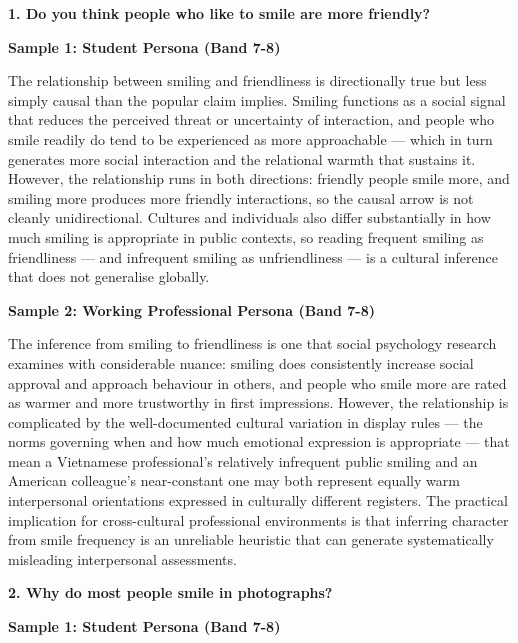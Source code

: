 \partthreeheader

\begin{ieltsquestion}
\textbf{1. Do you think people who like to smile are more friendly?}
\end{ieltsquestion}
\textbf{Sample 1: Student Persona (Band 7-8)}

The relationship between smiling and friendliness is directionally true but less simply causal than the popular claim implies. Smiling functions as a social signal that reduces the perceived threat or uncertainty of interaction, and people who smile readily do tend to be experienced as more approachable — which in turn generates more social interaction and the relational warmth that sustains it. However, the relationship runs in both directions: friendly people smile more, and smiling more produces more friendly interactions, so the causal arrow is not cleanly unidirectional. Cultures and individuals also differ substantially in how much smiling is appropriate in public contexts, so reading frequent smiling as friendliness — and infrequent smiling as unfriendliness — is a cultural inference that does not generalise globally.

\textbf{Sample 2: Working Professional Persona (Band 7-8)}

The inference from smiling to friendliness is one that social psychology research examines with considerable nuance: smiling does consistently increase social approval and approach behaviour in others, and people who smile more are rated as warmer and more trustworthy in first impressions. However, the relationship is complicated by the well-documented cultural variation in display rules — the norms governing when and how much emotional expression is appropriate — that mean a Vietnamese professional's relatively infrequent public smiling and an American colleague's near-constant one may both represent equally warm interpersonal orientations expressed in culturally different registers. The practical implication for cross-cultural professional environments is that inferring character from smile frequency is an unreliable heuristic that can generate systematically misleading interpersonal assessments.

\separator

\begin{ieltsquestion}
\textbf{2. Why do most people smile in photographs?}
\end{ieltsquestion}
\textbf{Sample 1: Student Persona (Band 7-8)}

